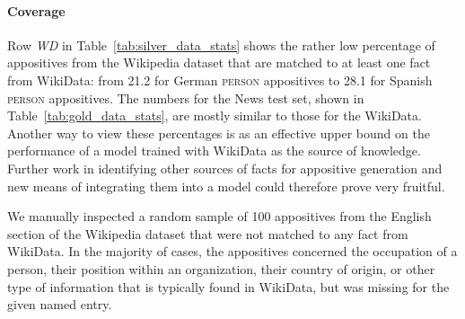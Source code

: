 \documentclass[11pt]{article}
\newcommand{\yktodo}[1]{\todo[color=green!20]{#1}}
\newcommand{\jttodo}[1]{\todo[color=blue!20]{#1}}
\begin{document}
\paragraph{Coverage} Row \textit{WD} %
in Table~\ref{tab:silver_data_stats} shows the rather low percentage of appositives from the Wikipedia dataset that are matched to at least one fact from WikiData: from 21.2 for German \textsc{person} appositives to 28.1 for Spanish \textsc{person} appositives. The numbers for the News test set, shown in Table~\ref{tab:gold_data_stats}, are mostly similar to those for the WikiData. Another way to view these percentages is as an effective upper bound on the performance of a model trained with WikiData as the source of knowledge. Further work in identifying other sources of facts for appositive generation and new means of integrating them into a model could therefore prove very fruitful. 


We manually inspected a random sample of 100 appositives from the English section of the Wikipedia dataset that were not matched to any fact from WikiData. In the majority of cases, the appositives concerned the occupation of a person, their position within an organization, their country of origin, or other type of information that is typically found in WikiData, but was missing for the given named entry.

\end{document}
